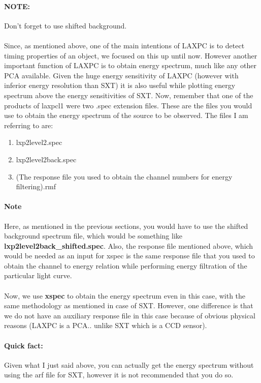 \documentclass[a4paper,twoside]{report}
\numberwithin{equation}{section}
\begin{document}
\paragraph{NOTE:} 
Don't forget to use shifted background. 
\paragraph{}
Since, as mentioned above, one of the main intentions of LAXPC is to detect timing properties of an object, we focused on this up until now. However another important function of LAXPC is to obtain energy spectrum, much like any other PCA available. Given the huge energy sensitivity of LAXPC (however with inferior energy resolution than SXT) it is also useful while plotting energy spectrum above the energy sensitivities of SXT. Now, remember that one of the products of laxpcl1 were two .spec extension files. These are the files you would use to obtain the energy spectrum of the source to be observed. The files I am referring to are:
\begin{enumerate}
\item lxp2level2.spec
\item lxp2level2back.spec
\item (The response file you used to obtain the channel numbers for energy filtering).rmf
\end{enumerate}
\paragraph{Note} Here, as mentioned in the previous sections, you would have to use the shifted background spectrum file, which would be something like \textbf{lxp2level2back\_shifted.spec}. Also, the response file mentioned above, which would be needed as an input for xspec is the same response file that you used to obtain the channel to energy relation while performing energy filtration of the particular light curve. 
\paragraph{}
Now, we use \textbf{xspec} to obtain the energy spectrum even in this case, with the same methodology as mentioned in case of SXT. However, one difference is that we do not have an auxiliary response file in this case because of obvious physical reasons (LAXPC is a PCA.. unlike SXT which is a CCD sensor). 
\paragraph{Quick fact:}
Given what I just said above, you can actually get the energy spectrum without using the arf file for SXT, however it is not recommended that you do so. 
\end{document}

